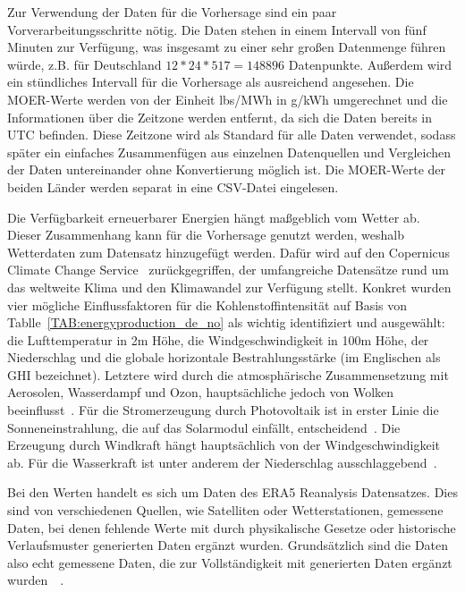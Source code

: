 Zur Verwendung der Daten für die Vorhersage sind ein paar Vorverarbeitungsschritte nötig.
Die Daten stehen in einem Intervall von fünf Minuten zur Verfügung, was insgesamt zu einer sehr großen Datenmenge führen würde, z.B. für Deutschland $12 * 24 * 517 = 148 896$ Datenpunkte.
Außerdem wird ein stündliches Intervall für die Vorhersage als ausreichend angesehen.
Die \ac{MOER}-Werte werden von der Einheit lbs/MWh in g/kWh umgerechnet und die Informationen über die Zeitzone werden entfernt, da sich die Daten bereits in \ac{UTC} befinden.
Diese Zeitzone wird als Standard für alle Daten verwendet, sodass später ein einfaches Zusammenfügen aus einzelnen Datenquellen und Vergleichen der Daten untereinander ohne Konvertierung möglich ist.
Die \ac{MOER}-Werte der beiden Länder werden separat in eine CSV-Datei eingelesen.

Die Verfügbarkeit erneuerbarer Energien hängt maßgeblich vom Wetter ab.
Dieser Zusammenhang kann für die Vorhersage genutzt werden, weshalb Wetterdaten zum Datensatz hinzugefügt werden.
Dafür wird auf den Copernicus Climate Change Service~\cite{Copernicus.20231212T14:09:40.000Z} zurückgegriffen, der umfangreiche Datensätze rund um das weltweite Klima und den Klimawandel zur Verfügung stellt.
Konkret wurden vier mögliche Einflussfaktoren für die Kohlenstoffintensität auf Basis von Tablle~\ref{TAB:energyproduction_de_no} als wichtig identifiziert und ausgewählt:
die Lufttemperatur in 2m Höhe, die Windgeschwindigkeit in 100m Höhe, der Niederschlag und die globale horizontale Bestrahlungsstärke (im Englischen als \ac{GHI} bezeichnet).
Letztere wird durch die atmosphärische Zusammensetzung mit Aerosolen, Wasserdampf und Ozon, hauptsächliche jedoch von Wolken beeinflusst~\cite{KallioMyers.2020}.
Für die Stromerzeugung durch Photovoltaik ist in erster Linie die Sonneneinstrahlung, die auf das Solarmodul einfällt, entscheidend~\cite{James.}.
Die Erzeugung durch Windkraft hängt hauptsächlich von der Windgeschwindigkeit ab.
Für die Wasserkraft ist unter anderem der Niederschlag ausschlaggebend~\cite{Copernicus.20231212T14:09:40.000Z}.

Bei den Werten handelt es sich um Daten des ERA5 Reanalysis Datensatzes.
Dies sind von verschiedenen Quellen, wie Satelliten oder Wetterstationen, gemessene Daten, bei denen fehlende Werte mit durch physikalische Gesetze oder historische Verlaufsmuster generierten Daten ergänzt wurden.
Grundsätzlich sind die Daten also echt gemessene Daten, die zur Vollständigkeit mit generierten Daten ergänzt wurden~\cite{CopernicusClimateChangeService.2020}~\cite{CopernicusKnowledgeBase.20231009}.

